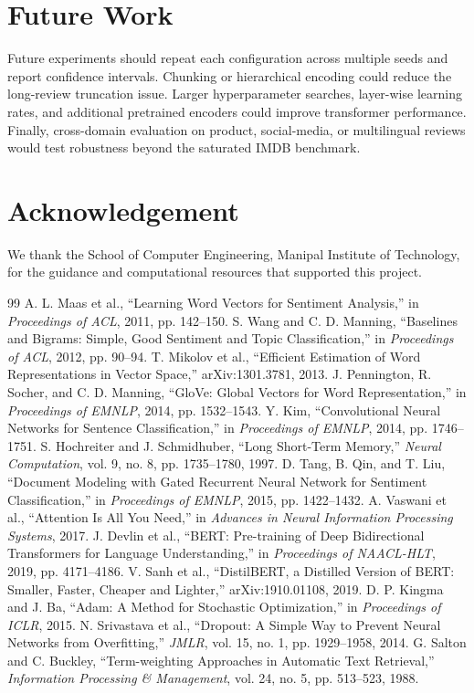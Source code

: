 \documentclass[12pt,a4paper]{article}
\begin{document}
\section{Future Work}
Future experiments should repeat each configuration across multiple seeds and report confidence intervals. Chunking or hierarchical encoding could reduce the long-review truncation issue. Larger hyperparameter searches, layer-wise learning rates, and additional pretrained encoders could improve transformer performance. Finally, cross-domain evaluation on product, social-media, or multilingual reviews would test robustness beyond the saturated IMDB benchmark.

\section*{Acknowledgement}
We thank the School of Computer Engineering, Manipal Institute of Technology, for the guidance and computational resources that supported this project.

\begin{thebibliography}{99}
 A. L. Maas et al., ``Learning Word Vectors for Sentiment Analysis,'' in \emph{Proceedings of ACL}, 2011, pp. 142--150.
 S. Wang and C. D. Manning, ``Baselines and Bigrams: Simple, Good Sentiment and Topic Classification,'' in \emph{Proceedings of ACL}, 2012, pp. 90--94.
 T. Mikolov et al., ``Efficient Estimation of Word Representations in Vector Space,'' arXiv:1301.3781, 2013.
 J. Pennington, R. Socher, and C. D. Manning, ``GloVe: Global Vectors for Word Representation,'' in \emph{Proceedings of EMNLP}, 2014, pp. 1532--1543.
 Y. Kim, ``Convolutional Neural Networks for Sentence Classification,'' in \emph{Proceedings of EMNLP}, 2014, pp. 1746--1751.
 S. Hochreiter and J. Schmidhuber, ``Long Short-Term Memory,'' \emph{Neural Computation}, vol. 9, no. 8, pp. 1735--1780, 1997.
 D. Tang, B. Qin, and T. Liu, ``Document Modeling with Gated Recurrent Neural Network for Sentiment Classification,'' in \emph{Proceedings of EMNLP}, 2015, pp. 1422--1432.
 A. Vaswani et al., ``Attention Is All You Need,'' in \emph{Advances in Neural Information Processing Systems}, 2017.
 J. Devlin et al., ``BERT: Pre-training of Deep Bidirectional Transformers for Language Understanding,'' in \emph{Proceedings of NAACL-HLT}, 2019, pp. 4171--4186.
 V. Sanh et al., ``DistilBERT, a Distilled Version of BERT: Smaller, Faster, Cheaper and Lighter,'' arXiv:1910.01108, 2019.
 D. P. Kingma and J. Ba, ``Adam: A Method for Stochastic Optimization,'' in \emph{Proceedings of ICLR}, 2015.
 N. Srivastava et al., ``Dropout: A Simple Way to Prevent Neural Networks from Overfitting,'' \emph{JMLR}, vol. 15, no. 1, pp. 1929--1958, 2014.
 G. Salton and C. Buckley, ``Term-weighting Approaches in Automatic Text Retrieval,'' \emph{Information Processing \& Management}, vol. 24, no. 5, pp. 513--523, 1988.
\end{thebibliography}
\end{document}
